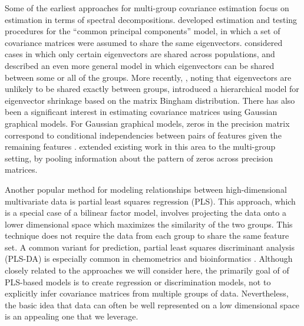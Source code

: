\documentclass[12pt]{article}
\begin{document}

Some of the earliest approaches for multi-group covariance estimation
focus on estimation in terms of spectral decompositions.
\cite{Flury1987} developed estimation and testing procedures for the
``common principal components'' model, in which a set of covariance
matrices were assumed to share the same eigenvectors.
\citet{Schott1991, Schott1999} considered cases in which only certain
eigenvectors are shared across populations, and \citet{Boik2002}
described an even more general model in which eigenvectors can be
shared between some or all of the groups.  More recently,
\citet{Hoff2009}, noting that eigenvectors are unlikely to be shared
exactly between groups, introduced a hierarchical model for
eigenvector shrinkage based on the matrix Bingham distribution.  There
has also been a significant interest in estimating covariance matrices
using Gaussian graphical models. For Gaussian graphical models, zeros
in the precision matrix correspond to conditional independencies
between pairs of features given the remaining features
\citep{Meinshausen2006}.  \citet{Witten2014} extended existing work in
this area to the multi-group setting, by pooling information about the
pattern of zeros across precision matrices.


Another popular method for modeling relationships between
high-dimensional multivariate data is partial least squares regression
(PLS). This approach, which is a special case of a bilinear factor
model, involves projecting the data onto a lower dimensional space which
maximizes the similarity of the two groups.  This technique does not
require the data from each group to share the same feature set.  A
common variant for prediction, partial least squares discriminant
analysis (PLS-DA) is especially common in chemometrics and
bioinformatics \citep{Barker2003} .  Although closely related to the
approaches we will consider here, the primarily goal of of PLS-based
models is to create regression or discrimination models, not to
explicitly infer covariance matrices from multiple groups of data.
Nevertheless, the basic idea that data can often be well represented
on a low dimensional space is an appealing one that we leverage.
\end{document}
